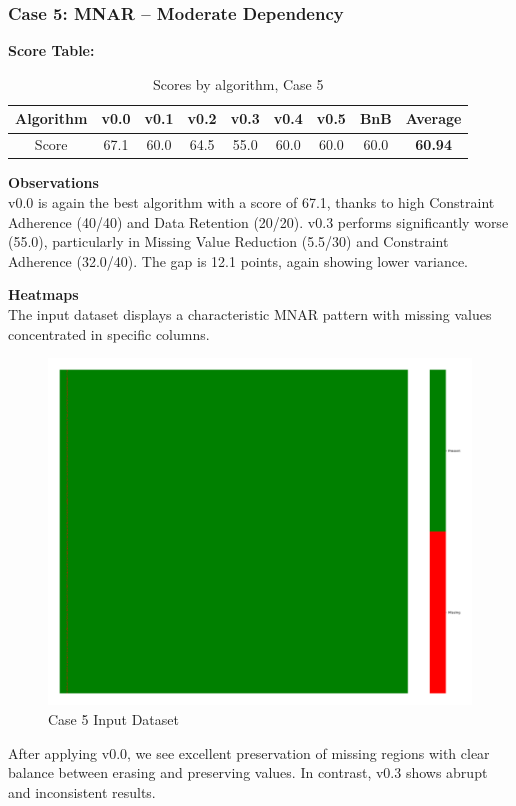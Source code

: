 \documentclass[a4paper,12pt]{article}
\begin{document}
\subsubsection{Case 5: MNAR – Moderate Dependency}

\textbf{Score Table:}

\begin{table}[H]
\centering
\caption{Scores by algorithm, Case 5}
\label{tab:score_algorithms_case5}
\begin{tabular}{|c|c|c|c|c|c|c|c|c|}
\hline
Algorithm & v0.0 & v0.1 & v0.2 & v0.3 & v0.4 & v0.5 & BnB & Average \\
\hline
Score & 67.1 & 60.0 & 64.5 & 55.0 & 60.0 & 60.0 & 60.0 & \textbf{60.94} \\
\hline
\end{tabular}
\end{table}

\textbf{Observations}\\
v0.0 is again the best algorithm with a score of 67.1, thanks to high Constraint Adherence (40/40) and Data Retention (20/20). v0.3 performs significantly worse (55.0), particularly in Missing Value Reduction (5.5/30) and Constraint Adherence (32.0/40). The gap is 12.1 points, again showing lower variance.  

\textbf{Heatmaps}\\
The input dataset displays a characteristic MNAR pattern with missing values concentrated in specific columns.

\begin{figure}[H]
    \centering
    \includegraphics[width=0.5\linewidth]{case5_heatmap_erased.png}
    \caption{Case 5 Input Dataset}
\end{figure}

After applying v0.0, we see excellent preservation of missing regions with clear balance between erasing and preserving values. In contrast, v0.3 shows abrupt and inconsistent results.
\end{document}

